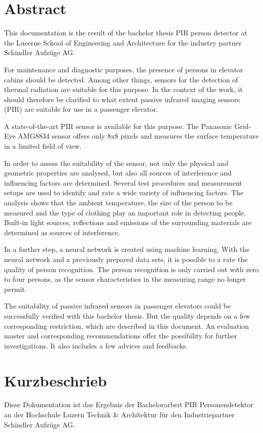 \chapter*{Abstract}
\label{chap:abstract_englisch}
This documentation is the result of the bachelor thesis PIR person detector at the Lucerne School of Engineering and Architecture for the industry partner Schindler Aufzüge AG.

For maintenance and diagnostic purposes, the presence of persons in elevator cabins should be detected. Among other things, sensors for the detection of thermal radiation are suitable for this purpose. In the context of the work, it should therefore be clarified to what extent passive infrared imaging sensors (PIR) are suitable for use in a passenger elevator. 

A state-of-the-art PIR sensor is available for this purpose. The Panasonic Grid-Eye AMG8834 sensor offers only 8x8 pixels and measures the surface temperature in a limited field of view.  

In order to assess the suitability of the sensor, not only the physical and geometric properties are analysed, but also all sources of interference and influencing factors are determined. Several test procedures and measurement setups are used to identify and rate a wide variety of influencing factors. The analysis shows that the ambient temperature, the size of the person to be measured and the type of clothing play an important role in detecting people. Built-in light sources, reflections and emissions of the surrounding materials are determined as sources of interference.  

In a further step, a neural network is created using machine learning. With the  neural network and a previously prepared data sets, it is possible to a rate the quality of person recognition. The person recognition is only carried out with zero to four persons, as the sensor characteristics in the measuring range no longer permit. 

The suitability of passive infrared sensors in passenger elevators could be successfully verified with this bachelor thesis. But the quality depends on a few corresponding restriction, which are described in this document. An evaluation master and corresponding recommendations offer the possibility for further investigations. It also includes a few advices and feedbacks. 


\chapter*{Kurzbeschrieb}
\label{chap:abstract_german}
Diese Dokumentation ist das Ergebnis der Bachelorarbeit {PIR} Personendetektor an der Hochschule Luzern Technik \& Architektur für den Industriepartner Schindler Aufzüge AG. 

